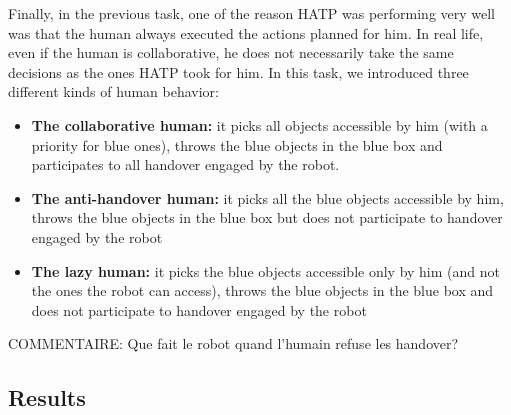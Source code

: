 \documentclass[english,a4paper,11pt,twoside]{StyleThese}
\begin{document}
Finally, in the previous task, one of the reason HATP was performing very well was that the human always executed the actions planned for him. In real life, even if the human is collaborative, he does not necessarily take the same decisions as the ones HATP took for him. In this task, we introduced three different kinds of human behavior:
\begin{itemize}
\item \textbf{The collaborative human:} it picks all objects accessible by him (with a priority for blue ones), throws the blue objects in the blue box and participates to all handover engaged by the robot.
\item \textbf{The anti-handover human:} it picks all the blue objects accessible by him, throws the blue objects in the blue box but does not participate to handover engaged by the robot
\item \textbf{The lazy human:} it picks the blue objects accessible only by him (and not the ones the robot can access), throws the blue objects in the blue box and does not participate to handover engaged by the robot
\end{itemize}
COMMENTAIRE: Que fait le robot quand l'humain refuse les handover?
\subsection{Results}
\end{document}
